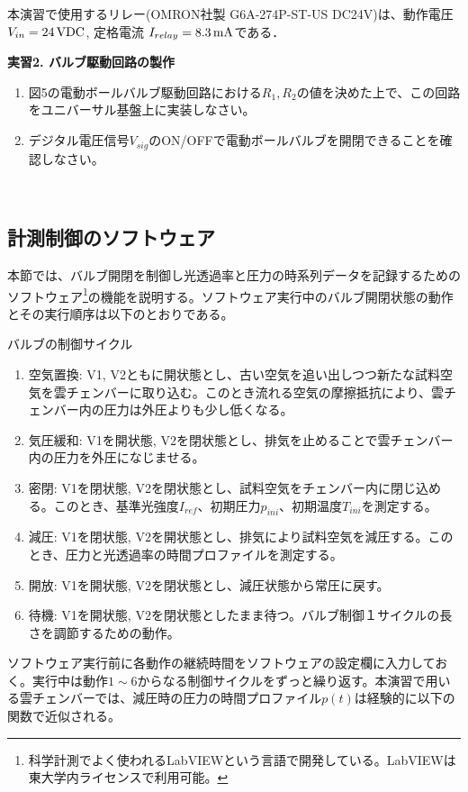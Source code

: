 \documentclass{jsarticle}
\begin{document}
本演習で使用するリレー(OMRON社製 G6A-274P-ST-US DC24V)は、動作電圧 $V_{in}=24 \,\rm{VDC}$, 定格電流 $I_{relay}=8.3 \,\rm{mA}$である．
\\
\begin{itembox}[l]{\bf{実習2. バルブ駆動回路の製作}}
\begin{enumerate}
\item 図5の電動ボールバルブ駆動回路における$R_{1},R_{2}$の値を決めた上で、この回路をユニバーサル基盤上に実装しなさい。
\item デジタル電圧信号$V_{sig}$のON/OFFで電動ボールバルブを開閉できることを確認しなさい。
\end{enumerate}
\end{itembox}
\\
\subsection{計測制御のソフトウェア}
本節では、バルブ開閉を制御し光透過率と圧力の時系列データを記録するためのソフトウェア\footnote{科学計測でよく使われるLabVIEWという言語で開発している。LabVIEWは東大学内ライセンスで利用可能。}の機能を説明する。ソフトウェア実行中のバルブ開閉状態の動作とその実行順序は以下のとおりである。
\begin{itembox}[l]{バルブの制御サイクル}
\begin{enumerate}
\item 空気置換: V1, V2ともに開状態とし、古い空気を追い出しつつ新たな試料空気を雲チェンバーに取り込む。このとき流れる空気の摩擦抵抗により、雲チェンバー内の圧力は外圧よりも少し低くなる。
\item 気圧緩和: V1を開状態, V2を閉状態とし、排気を止めることで雲チェンバー内の圧力を外圧になじませる。
\item 密閉: V1を閉状態, V2を閉状態とし、試料空気をチェンバー内に閉じ込める。このとき、基準光強度$I_{ref}$、初期圧力$p_{ini}$、初期温度$T_{ini}$を測定する。
\item 減圧: V1を閉状態, V2を開状態とし、排気により試料空気を減圧する。このとき、圧力と光透過率の時間プロファイルを測定する。
\item 開放: V1を開状態, V2を閉状態とし、減圧状態から常圧に戻す。
\item 待機: V1を開状態, V2を閉状態としたまま待つ。バルブ制御１サイクルの長さを調節するための動作。
\end{enumerate}
\end{itembox}
ソフトウェア実行前に各動作の継続時間をソフトウェアの設定欄に入力しておく。実行中は動作$1 \sim 6$からなる制御サイクルをずっと繰り返す。本演習で用いる雲チェンバーでは、減圧時の圧力の時間プロファイル$p(t)$は経験的に以下の関数で近似される。
\end{document}
